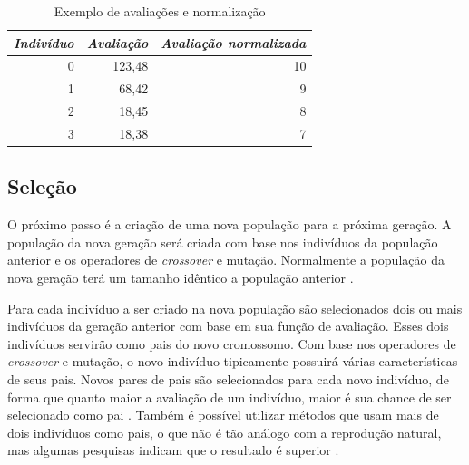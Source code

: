\documentclass[12pt,oneside,a4paper,english,french,spanish,brazil,]{abntex2}
\begin{document}
\begin{table}[tbp]
\centering
\caption{Exemplo de avaliações e normalização}
\label{tab:Normalizacao_Avaliacao}
\begin{tabular}{rrr}
\hline
\multicolumn{1}{l}{\textit{\textbf{Indivíduo}}} & \multicolumn{1}{l}{\textit{\textbf{Avaliação}}} & \multicolumn{1}{l}{\textit{\textbf{Avaliação normalizada}}} \\ \hline
0                                                & 123,48                                           & 10                                                           \\
1                                                & 68,42                                            & 9                                                            \\
2                                                & 18,45                                            & 8                                                            \\
3                                                & 18,38                                            & 7    \\ \hline                                                       
\end{tabular}
\end{table}

\subsection{Seleção}

O próximo passo é a criação de uma nova população para a próxima geração. A população da nova geração será criada com base nos indivíduos da população anterior e os operadores de \textit{crossover} e mutação. Normalmente a população da nova geração terá um tamanho idêntico a população anterior \cite{linden:2008}.

Para cada indivíduo a ser criado na nova população são selecionados dois ou mais indivíduos da geração anterior com base em sua função de avaliação. Esses dois indivíduos servirão como pais do novo cromossomo. Com base nos operadores de \textit{crossover} e mutação, o novo indivíduo tipicamente possuirá várias características de seus pais. Novos pares de pais são selecionados para cada novo indivíduo, de forma que quanto maior a avaliação de um indivíduo, maior é sua chance de ser selecionado como pai \cite{linden:2008}. Também é possível utilizar métodos que usam mais de dois indivíduos como pais, o que não é tão análogo com a reprodução natural, mas algumas pesquisas indicam que o resultado é superior \cite{ting:2005} \cite{eiben:1994}.
\end{document}
